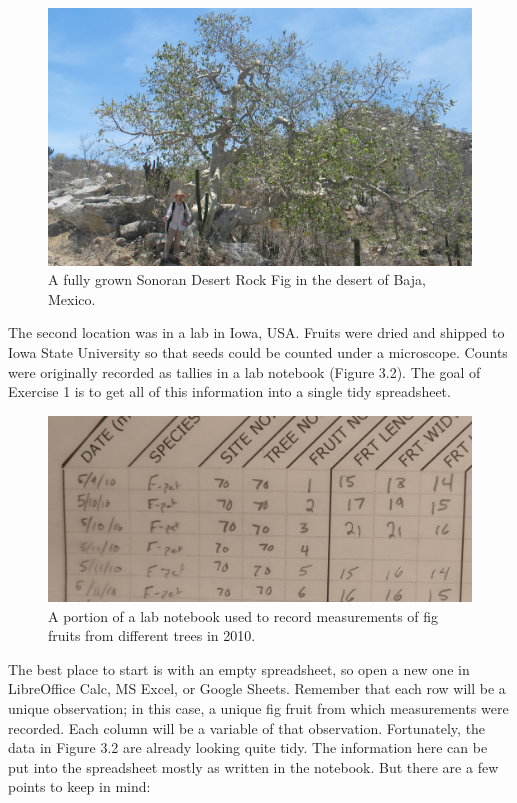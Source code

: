 \documentclass[
]{scrbook}
\begin{document}
\begin{figure}
\includegraphics[width=1\linewidth]{img/Ficus_petiolaris} \caption{A fully grown Sonoran Desert Rock Fig in the desert of Baja, Mexico.}\label{fig:unnamed-chunk-11}
\end{figure}

The second location was in a lab in Iowa, USA.
Fruits were dried and shipped to Iowa State University so that seeds could be counted under a microscope.
Counts were originally recorded as tallies in a lab notebook (Figure 3.2).
The goal of Exercise 1 is to get all of this information into a single tidy spreadsheet.

\begin{figure}
\includegraphics[width=1\linewidth]{img/handwritten_data} \caption{A portion of a lab notebook used to record measurements of fig fruits from different trees in 2010.}\label{fig:unnamed-chunk-12}
\end{figure}

The best place to start is with an empty spreadsheet, so open a new one in LibreOffice Calc, MS Excel, or Google Sheets.
Remember that each row will be a unique observation; in this case, a unique fig fruit from which measurements were recorded.
Each column will be a variable of that observation.
Fortunately, the data in Figure 3.2 are already looking quite tidy.
The information here can be put into the spreadsheet mostly as written in the notebook.
But there are a few points to keep in mind:
\end{document}

